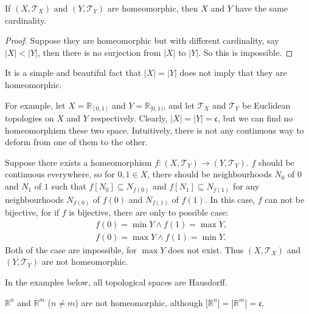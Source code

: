 \begin{proposition}
	If $(X, \mathcal T_X)$ and $(Y, \mathcal T_Y)$ are homeomorphic, then $X$ and $Y$ have the same cardinality.
	
	\begin{proof}
		Suppose they are homeomorphic but with different cardinality, say $|X| < |Y|$, then there is no surjection from $|X|$ to $|Y|$. So this is impossible.
	\end{proof}
\end{proposition}


\begin{note}
	It is a simple and beautiful fact that $|X| = |Y|$ does not imply that they are homeomorphic. 
	
	For example, let $X = \mathbb R_{[0,1]}$ and $Y = \mathbb R_{[0,1)}$, and let $\mathcal T_X$ and $\mathcal T_Y$ be Euclidean topologies on $X$ and $Y$ respectively. Clearly, $|X| = |Y| = \mathfrak{c}$, but we can find no homeomorphism these two space. Intuitively, there is not any continuous way to deform from one of them to the other.
	
	Suppose there exists a homeomorphism $f:(X, \mathcal T_Y) \to (Y, \mathcal T_Y)$. $f$ should be continuous everywhere, so for $0, 1 \in X$, there should be neighbourhoods $N_0$ of $0$ and $N_1$ of $1$ such that $f[N_0] \subseteq N_{f(0)}$ and $f[N_1] \subseteq N_{f(1)}$ for any neighbourhoods $N_{f(0)}$ of $f(0)$ and $N_{f(1)}$ of $f(1)$. In this case, $f$ can not be bijective, for if $f$ is bijective, there are only to possible case: 
	$$
	\begin{aligned}
		& f(0) = \min Y \land f(1) = \max Y, \\
		& f(0) = \max Y \land f(1) = \min Y.
	\end{aligned}
	$$
	Both of the case are impossible, for $\max Y$ does not exist. Thus $(X, \mathcal T_X)$ and $(Y, \mathcal T_Y)$ are not homeomorphic.
\end{note}


\begin{note}
	In the examples below, all topological spaces are Hausdorff.
\end{note}


\begin{example}
	$\mathbb R^n$ and $\mathbb R^m$ ($n \ne m$) are not homeomorphic, although $|\mathbb R^n| = |\mathbb R^m| = \mathfrak{c}$.
\end{example}


